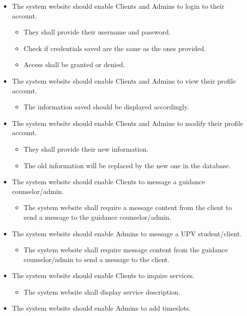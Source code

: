 \begin{enumerate}
\begin{itemize}
		\item The system website should enable Clients and Admins to login to their account. 
			\begin{itemize}
			\item They shall provide their username and password. 
			\item Check if credentials saved are the same as the ones provided. 
			\item Access shall be granted or denied. 
			\end{itemize}
		\item The system website should enable Clients and Admins to view their profile account. 
			\begin{itemize}
			\item The information saved should be displayed accordingly. 
			\end{itemize}
		\item The system website should enable Clients and Admins to modify their profile account. 
			\begin{itemize}
			\item They shall provide their new information. 
			\item The old information will be replaced by the new one in the database. 
			\end{itemize}
		\item The system website should enable Clients to message a guidance counselor/admin. 
			\begin{itemize}
			\item The system website shall require a message content from the client to send a message to the guidance counselor/admin. 
			\end{itemize}
		\item The system website should enable Admins to message a UPV student/client.  
			\begin{itemize}
			\item The system website shall require message content from the guidance counselor/admin to send a message to the client.  
			\end{itemize}
		\item The system website should enable Clients to inquire services. 
			\begin{itemize}
			\item The system website shall display service description. 
			\end{itemize}
		\item The system website should enable Admins to add timeslots. 

\end{itemize}
\end{enumerate}
